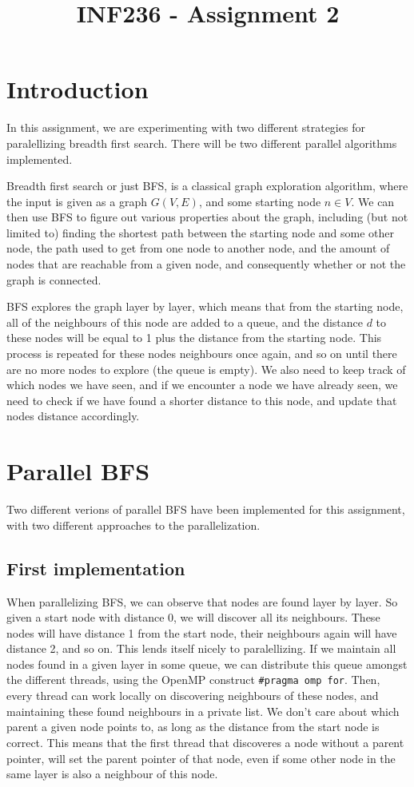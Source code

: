 \documentclass{article}
\title{INF236 - Assignment 2}
\begin{document}
\maketitle
\newpage
\tableofcontents
\newpage
\section{Introduction}
In this assignment, we are experimenting with two different strategies for paralellizing breadth first search. There will be two different parallel algorithms implemented.
\medskip

Breadth first search or just BFS, is a classical graph exploration algorithm, where the input is given as a graph \( G\left( V,E \right) \), and some starting node \( n \in V \). We can then use BFS to figure out various properties about the graph, including (but not limited to) finding the shortest path between the starting node and some other node, the path used to get from one node to another node, and the amount of nodes that are reachable from a given node, and consequently whether or not the graph is connected. 
\medskip

BFS explores the graph layer by layer, which means that from the starting node, all of the neighbours of this node are added to a queue, and the distance \( d \) to these nodes will be equal to 1 plus the distance from the starting node. This process is repeated for these nodes neighbours once again, and so on until there are no more nodes to explore (the queue is empty). We also need to keep track of which nodes we have seen, and if we encounter a node we have already seen, we need to check if we have found a shorter distance to this node, and update that nodes distance accordingly.

\section{Parallel BFS}
Two different verions of parallel BFS have been implemented for this assignment, with two different approaches to the parallelization.

\subsection{First implementation}
When parallelizing BFS, we can observe that nodes are found layer by layer. So given a start node with distance 0, we will discover all its neighbours. These nodes will have distance 1 from the start node, their neighbours again will have distance 2, and so on. This lends itself nicely to paralellizing. If we maintain all nodes found in a given layer in some queue, we can distribute this queue amongst the different threads, using the OpenMP construct \texttt{\#pragma omp for}. Then, every thread can work locally on discovering neighbours of these nodes, and maintaining these found neighbours in a private list. We don't care about which parent a given node points to, as long as the distance from the start node is correct. This means that the first thread that discoveres a node without a parent pointer, will set the parent pointer of that node, even if some other node in the same layer is also a neighbour of this node.
\medskip
\end{document}
